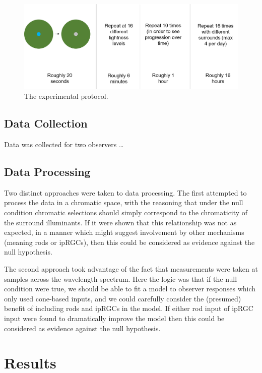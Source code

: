 \begin{figure}[htbp]
\includegraphics[max width=\textwidth]{figs/LargeSphere/ExperimentalPro.png}
\caption{The experimental protocol.}
\label{fig:ExperimentalPro}
\end{figure}

\subsection{Data Collection}

Data was collected for two observers \dots

\subsection{Data Processing}

Two distinct approaches were taken to data processing. The first attempted to process the data in a chromatic space, with the reasoning that under the null condition chromatic selections should simply correspond to the chromaticity of the surround illuminants. If it were shown that this relationship was not as expected, in a manner which might suggest involvement by other mechanisms (meaning rods or \glspl{ipRGC}), then this could be considered as evidence against the null hypothesis.

The second approach took advantage of the fact that measurements were taken at samples across the wavelength spectrum. Here the logic was that if the null condition were true, we should be able to fit a model to observer responses which only used cone-based inputs, and we could carefully consider the (presumed) benefit of including rods and \glspl{ipRGC} in the model. If either rod input of \gls{ipRGC} input were found to dramatically improve the model then this could be considered as evidence against the null hypothesis.

\section{Results}

